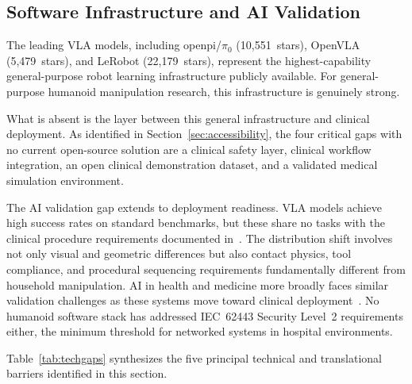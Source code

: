 \subsection{Software Infrastructure and AI Validation}
\label{sec:software}

The leading VLA models, including openpi/$\pi_0$ (10,551~stars), OpenVLA (5,479~stars),
and LeRobot (22,179~stars), represent the highest-capability general-purpose
robot learning infrastructure publicly available. For general-purpose humanoid
manipulation research, this infrastructure is genuinely strong.

What is absent is the layer between this general infrastructure and clinical
deployment. As identified in Section~\ref{sec:accessibility}, the four critical gaps
with no current open-source solution are a clinical safety layer, clinical
workflow integration, an open clinical demonstration dataset, and a validated
medical simulation environment.

The AI validation gap extends to deployment readiness. VLA models achieve high
success rates on standard benchmarks, but these share no tasks with the clinical
procedure requirements documented in~\cite{atar2025humanoids}. The distribution
shift involves not only visual and geometric differences but also contact physics,
tool compliance, and procedural sequencing requirements fundamentally different
from household manipulation. AI in health and medicine more broadly faces similar
validation challenges as these systems move toward clinical
deployment~\cite{topol2019high,rajpurkar2022ai,coiera2019last,sendak2020real}. No humanoid software stack has
addressed IEC~62443 Security Level~2 requirements either, the minimum threshold
for networked systems in hospital environments.

Table~\ref{tab:techgaps} synthesizes the five principal technical and
translational barriers identified in this section.

